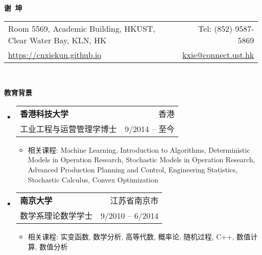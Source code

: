 \documentclass[letterpaper,9pt]{ctexart}
\makeatletter
\newcommand{\resitem}[1]{\item #1 \vspace{-2pt}}
\newcommand{\resheading}[1]{{\large \colorbox{mygrey}{\begin{minipage}{\textwidth}{\textbf{#1 \vphantom{p\^{E}}}}\end{minipage}}}}
\newcommand{\ressubheading}[4]{
\begin{tabular*}{6.5in}{l@{\extracolsep{\fill}}r}
    \textbf{#1} & #2 \\
    #3 & #4 \\
\end{tabular*}\vspace{-6pt}}
\makeatother
\begin{document}


\newcommand{\mywebheader}{
\begin{tabular*}{\linewidth}{l@{\extracolsep{\fill}}r}
    {\large Room 5569, Academic Building, HKUST, Clear Water Bay, KLN, HK} & {\large Tel: (852) 9587-5869} \\
    {\large \href{https://cnxiekun.github.io}{https://cnxiekun.github.io}} & {\large \href{mailto:kxie@connect.ust.hk}{kxie@connect.ust.hk}}
\end{tabular*}
\\
\vspace{0.15in}}

\begin{center}
    \textbf{{\huge 谢~坤}}
\end{center}

\vspace{0.1in}

\mywebheader
\quad


\resheading{教育背景}
\begin{itemize}
\item \ressubheading{香港科技大学}{香港}{工业工程与运营管理学博士}{9/2014 -- 至今}

\begin{itemize}
\resitem{相关课程: Machine Learning, Introduction to Algorithms, Deterministic Models in Operation Research, Stochastic Models in Operation Research, Advanced Production Planning and Control, Engineering Statistics, Stochastic Calculus, Convex Optimization}
\end{itemize}

\item \ressubheading{南京大学}{江苏省南京市}{数学系理论数学学士}{9/2010 -- 6/2014}

\begin{itemize}
\resitem{相关课程: 实变函数, 数学分析, 高等代数, 概率论, 随机过程, C++, 数值计算, 数值分析}
\end{itemize}

\end{itemize}
\end{document}
